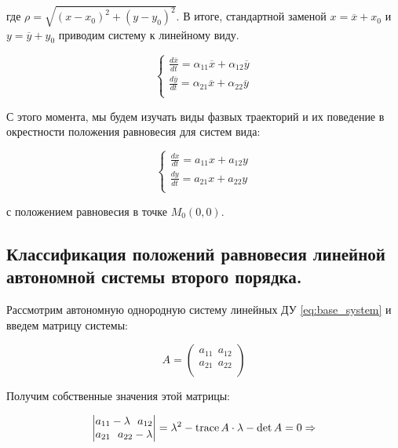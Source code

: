 где $\rho = \sqrt{(x - x_0)^2 + (y - y_0)^2}$. В итоге, стандартной заменой $x = \overline{x} + x_0$ и $y = \overline{y} + y_0$ приводим систему к линейному виду.

\begin{equation}
  \begin{cases}
    \frac{d \overline{x}}{d t} = \alpha_{11} \overline{x} + \alpha_{12} \overline{y} \\
    \frac{d \overline{y}}{d t} = \alpha_{21} \overline{x} + \alpha_{22} \overline{y} \\        
  \end{cases}
\end{equation}

С этого момента, мы будем изучать виды фазвых траекторий и их поведение в окрестности положения равновесия для систем вида:

\begin{equation} \label{eq:base_system}
  \begin{cases}
    \frac{d x}{d t} = a_{11} x + a_{12} y \\
    \frac{d y}{d t} = a_{21} x + a_{22} y \\        
  \end{cases}
\end{equation}

с положением равновесия в точке $M_0(0, 0)$.

\subsection{Классификация положений равновесия линейной автономной системы второго порядка.}

Рассмотрим автономную однородную систему линейных ДУ \eqref{eq:base_system} и введем матрицу системы:

\begin{equation}
  A = 
  \begin{pmatrix}
    a_{11} ~~ a_{12} \\
    a_{21} ~~ a_{22} \\
  \end{pmatrix}
\end{equation}

Получим собственные значения этой матрицы:

\begin{equation}
  \begin{vmatrix}
    a_{11} - \lambda ~~ a_{12} \\
    a_{21} ~~ a_{22} - \lambda \\
  \end{vmatrix} = 
  \lambda^2 - \operatorname{trace} A \cdot \lambda - \det A = 0 \Rightarrow
\end{equation}

